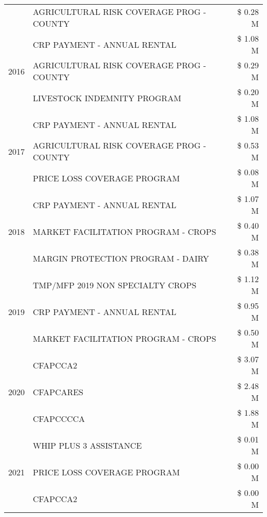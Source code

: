 \begin{tabular}{llr}
 & AGRICULTURAL RISK COVERAGE PROG - COUNTY & \$ 0.28 M \\
\cline{1-3}
\multirow[t]{3}{*}{2016} & CRP PAYMENT - ANNUAL RENTAL & \$ 1.08 M \\
 & AGRICULTURAL RISK COVERAGE PROG - COUNTY & \$ 0.29 M \\
 & LIVESTOCK INDEMNITY PROGRAM & \$ 0.20 M \\
\cline{1-3}
\multirow[t]{3}{*}{2017} & CRP PAYMENT - ANNUAL RENTAL & \$ 1.08 M \\
 & AGRICULTURAL RISK COVERAGE PROG - COUNTY & \$ 0.53 M \\
 & PRICE LOSS COVERAGE PROGRAM & \$ 0.08 M \\
\cline{1-3}
\multirow[t]{3}{*}{2018} & CRP PAYMENT - ANNUAL RENTAL & \$ 1.07 M \\
 & MARKET FACILITATION PROGRAM - CROPS & \$ 0.40 M \\
 & MARGIN PROTECTION PROGRAM - DAIRY & \$ 0.38 M \\
\cline{1-3}
\multirow[t]{3}{*}{2019} & TMP/MFP 2019 NON SPECIALTY CROPS & \$ 1.12 M \\
 & CRP PAYMENT - ANNUAL RENTAL & \$ 0.95 M \\
 & MARKET FACILITATION PROGRAM - CROPS & \$ 0.50 M \\
\cline{1-3}
\multirow[t]{3}{*}{2020} & CFAPCCA2 & \$ 3.07 M \\
 & CFAPCARES & \$ 2.48 M \\
 & CFAPCCCCA & \$ 1.88 M \\
\cline{1-3}
\multirow[t]{3}{*}{2021} & WHIP PLUS 3 ASSISTANCE & \$ 0.01 M \\
 & PRICE LOSS COVERAGE PROGRAM & \$ 0.00 M \\
 & CFAPCCA2 & \$ 0.00 M \\
\cline{1-3}
\bottomrule
\end{tabular}
